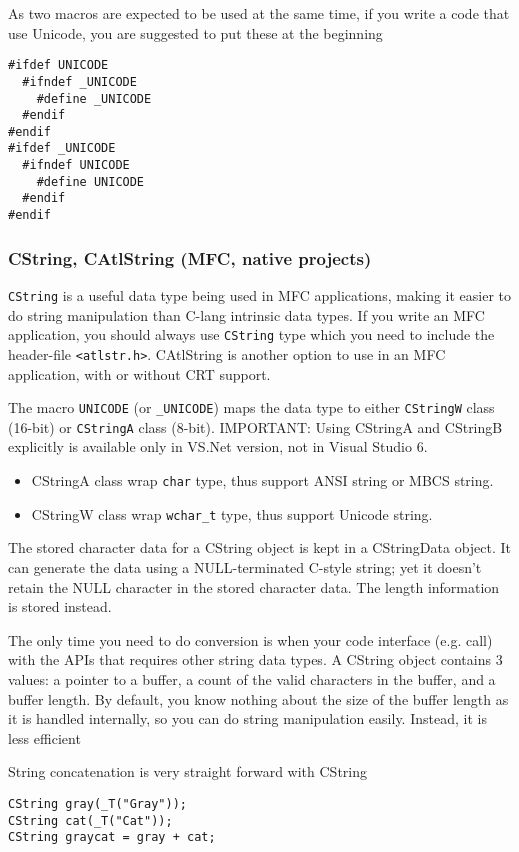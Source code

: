 As two macros are expected to be used at the same time, if you write a code
that use Unicode, you are suggested to put these at the beginning
\begin{verbatim}
#ifdef UNICODE
  #ifndef _UNICODE
    #define _UNICODE
  #endif
#endif
#ifdef _UNICODE
  #ifndef UNICODE
    #define UNICODE
  #endif
#endif
\end{verbatim}


\subsubsection{CString, CAtlString (MFC, native projects)}
\label{sec:CString}

\verb!CString! is a useful data type being used in MFC applications, making it
easier to do string manipulation than C-lang intrinsic data types. If you write
an MFC application, you should always use \verb!CString! type which you need to
include the header-file \verb!<atlstr.h>!. CAtlString is another option to use
in an MFC application, with or without CRT support.

The macro \verb!UNICODE! (or \verb!_UNICODE!) maps the data type to either
\verb!CStringW! class (16-bit) or \verb!CStringA! class (8-bit). IMPORTANT:
Using CStringA and CStringB explicitly is available only in VS.Net version, not
in Visual Studio 6.
\begin{itemize}
  \item CStringA class wrap \verb!char! type, thus support ANSI string or MBCS
  string. 
  
  \item CStringW class wrap \verb!wchar_t! type, thus support Unicode string.
\end{itemize}
The stored character data for a CString object is kept in a CStringData object.
It can generate the data using a NULL-terminated C-style string; yet it doesn't
retain the NULL character in the stored character data. The length information
is stored instead.

The only time you need to do conversion is when your code interface (e.g. call)
with the APIs that requires other string data types. A CString object contains 3
values: a pointer to a buffer, a count of the valid characters in the buffer,
and a buffer length. By default, you know nothing about the size of the buffer
length as it is handled internally, so you can do string manipulation easily.
Instead, it is less efficient




String concatenation is very straight forward with CString
\begin{verbatim}
CString gray(_T("Gray"));
CString cat(_T("Cat"));
CString graycat = gray + cat;
\end{verbatim}

